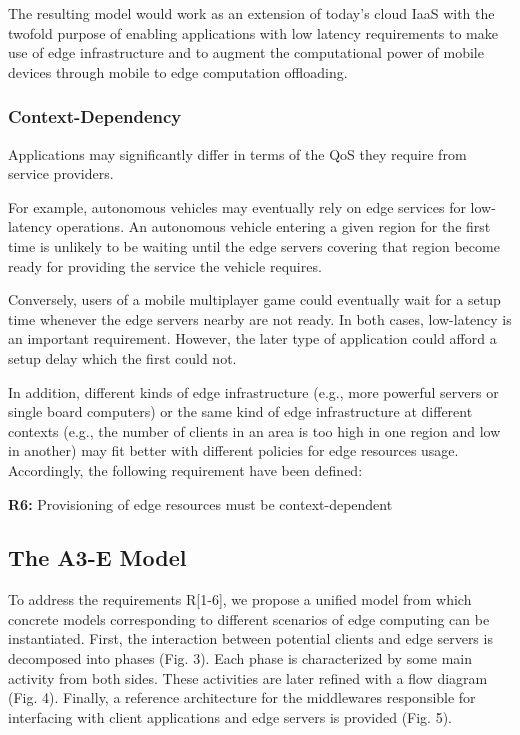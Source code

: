 The resulting model would work as an extension of today’s cloud IaaS with the twofold purpose of enabling applications with low latency requirements to make use of edge infrastructure and to augment the computational power of mobile devices through mobile to edge computation offloading. 

\subsubsection{Context-Dependency }

Applications may significantly differ in terms of the QoS they require from service providers. 

For example, autonomous vehicles may eventually rely on edge services for low-latency operations. An autonomous vehicle entering a given region for the first time is unlikely to be waiting until the edge servers covering that region become ready for providing the service the vehicle requires. 

Conversely, users of a mobile multiplayer game could eventually wait for a setup time whenever the edge servers nearby are not ready. In both cases, low-latency is an important requirement. However, the later type of application could afford a setup delay which the first could not. 

In addition, different kinds of edge infrastructure (e.g., more powerful servers or single board computers) or the same kind of edge infrastructure at different contexts (e.g., the number of clients in an area is too high in one region and low in another) may fit better with different policies for edge resources usage. Accordingly, the following requirement have been defined:

\textbf{R6:} Provisioning of edge resources must be context-dependent

\subsection{The A3-E Model}

To address the requirements R[1-6], we propose a unified model from which concrete models corresponding to different scenarios of edge computing can be instantiated. 
First, the interaction between potential clients and edge servers is decomposed into phases (Fig. 3). Each phase is characterized by some main activity from both sides. These activities are later refined with a flow diagram (Fig. 4). Finally, a reference architecture for the middlewares responsible for interfacing with client applications and edge servers is provided (Fig. 5).

